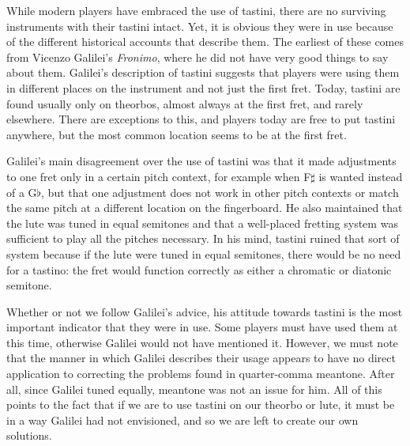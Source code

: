 While modern players have embraced the use of tastini, there are no surviving
instruments with their tastini intact.  Yet, it is obvious they were in use
because of the different historical accounts that describe them.  The earliest
of these comes from Vicenzo Galilei's \textit{Fronimo}, where he did not have
very good things to say about them. Galilei's description of tastini suggests
that players were using them in different places on the instrument and not just
the first fret.\autocite[165]{VG:1} Today, tastini are found usually only
on theorbos, almost always at the first fret, and rarely elsewhere. There are
exceptions to this, and players today are free to put tastini anywhere, but the
most common location seems to be at the first fret.

Galilei's main disagreement over the use of tastini was that it made adjustments to one
fret only in a certain pitch context, for example when F$\sharp$ is wanted instead
of a G$\flat$, but that one adjustment does not work in other pitch contexts or match the
same pitch at a different location on the fingerboard.  He also
maintained that the lute was tuned in equal semitones and that a well-placed fretting system
was sufficient to play all the pitches necessary. In his mind, tastini ruined that sort of system
because if the lute were tuned in equal semitones, there would be no need for
a tastino: the fret would function correctly as either a chromatic or diatonic
semitone.

Whether or not we follow Galilei's advice, his attitude towards tastini is the most
important indicator that they were in use.  Some players must have used them at this
time, otherwise Galilei would not have mentioned it.  However, we must note that the
manner in which Galilei describes their usage appears to have no direct application to
correcting the problems found in quarter-comma meantone.  After all, since Galilei
tuned equally, meantone was not an issue for him.  All of this points to the fact
that if we are to use tastini on our theorbo or lute, it must be in a way Galilei had
not envisioned, and so we are left to create our own solutions.

